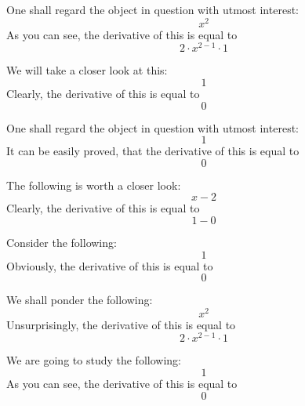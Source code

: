 \documentclass{article}
\begin{document}
One shall regard the object in question with utmost interest:
\begin{equation}
x ^{2 } 
\end{equation}
As you can see, the derivative of this is equal to
\begin{equation}
2 \cdot x ^{2 - 1 } \cdot 1 
\end{equation}

We will take a closer look at this:
\begin{equation}
1 
\end{equation}
Clearly, the derivative of this is equal to
\begin{equation}
0 
\end{equation}

One shall regard the object in question with utmost interest:
\begin{equation}
1 
\end{equation}
It can be easily proved, that the derivative of this is equal to
\begin{equation}
0 
\end{equation}

The following is worth a closer look:
\begin{equation}
x - 2 
\end{equation}
Clearly, the derivative of this is equal to
\begin{equation}
1 - 0 
\end{equation}

Consider the following:
\begin{equation}
1 
\end{equation}
Obviously, the derivative of this is equal to
\begin{equation}
0 
\end{equation}

We shall ponder the following:
\begin{equation}
x ^{2 } 
\end{equation}
Unsurprisingly, the derivative of this is equal to
\begin{equation}
2 \cdot x ^{2 - 1 } \cdot 1 
\end{equation}

We are going to study the following:
\begin{equation}
1 
\end{equation}
As you can see, the derivative of this is equal to
\begin{equation}
0 
\end{equation}
\end{document}

